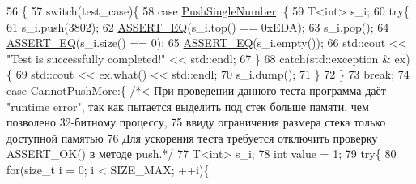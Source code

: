 \begin{DoxyCode}
56                             \{
57         \textcolor{keywordflow}{switch}(test\_case)\{                                                    
58             \textcolor{keywordflow}{case} \hyperlink{namespacestk__test_aee7ec7a767abf7b0b65ce9a2afb7de78a16992c4d9ecd605ea8503740aee9df96}{PushSingleNumber}:  \{                                        
59                 T<int> s\_i;                                                 
60                 \textcolor{keywordflow}{try}\{                                                                                                
61                     s\_i.push(3802);                                         
62                     \hyperlink{main__file_8cpp_a12d9e096a8640ee0477e1cb3505c21b3}{ASSERT\_EQ}(s\_i.top() == 0xEDA);
63                     s\_i.pop();
64                     \hyperlink{main__file_8cpp_a12d9e096a8640ee0477e1cb3505c21b3}{ASSERT\_EQ}(s\_i.size() == 0);
65                     \hyperlink{main__file_8cpp_a12d9e096a8640ee0477e1cb3505c21b3}{ASSERT\_EQ}(s\_i.empty());
66                     std::cout << \textcolor{stringliteral}{"Test is successfully completed!"} << std::endl;
67                 \}                                                               
68                 \textcolor{keywordflow}{catch}(std::exception & ex)\{                                                
69                     std::cout << ex.what() << std::endl;
70                     s\_i.dump();
71                 \} 
72                                     \}                                                           
73                 \textcolor{keywordflow}{break}; 
74             \textcolor{keywordflow}{case} \hyperlink{namespacestk__test_aee7ec7a767abf7b0b65ce9a2afb7de78a6e2bd84a1d3046f2c01c930a1d52be64}{CannotPushMore}:\{ \textcolor{comment}{/*< При проведении данного теста программа даёт "runtime
       error", так как пытается выделить под стек больше памяти, чем позволено 32-битному процессу,}
75 \textcolor{comment}{                                   ввиду ограничения размера стека только доступной памятью                                                                                     
       }
76 \textcolor{comment}{                                   Для ускорения теста требуется отключить проверку ASSERT\_OK() в методе
       push.*/}
77                 T<int> s\_i; 
78                 \textcolor{keywordtype}{int} value = 1;
79                 \textcolor{keywordflow}{try}\{
80                     \textcolor{keywordflow}{for}(\textcolor{keywordtype}{size\_t} i = 0; i < SIZE\_MAX; ++i)\{

\end{DoxyCode}
